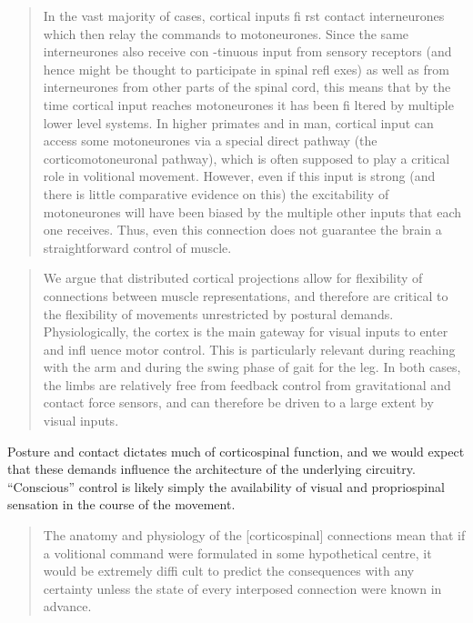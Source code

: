 \documentclass[../main.tex]{subfiles}
\begin{document}
{{{\begin{quote}
In the vast majority of cases, cortical inputs fi rst contact
interneurones which then relay the commands to motoneurones. Since the
same interneurones also receive con -tinuous input from sensory
receptors (and hence might be thought to participate in spinal refl
exes) as well as from interneurones from other parts of the spinal cord,
this means that by the time cortical input reaches motoneurones it has
been fi ltered by multiple lower level systems. In higher primates and
in man, cortical input can access some motoneurones via a special direct
pathway (the corticomotoneuronal pathway), which is often supposed to
play a critical role in volitional movement. However, even if this input
is strong (and there is little comparative evidence on this) the
excitability of motoneurones will have been biased by the multiple other
inputs that each one receives. Thus, even this connection does not
guarantee the brain a straightforward control of muscle.
\end{quote}

\begin{quote}
We argue that distributed cortical projections allow for flexibility of
connections between muscle representations, and therefore are critical
to the flexibility of movements unrestricted by postural demands.
Physiologically, the cortex is the main gateway for visual inputs to
enter and infl uence motor control. This is particularly relevant during
reaching with the arm and during the swing phase of gait for the leg. In
both cases, the limbs are relatively free from feedback control from
gravitational and contact force sensors, and can therefore be driven to
a large extent by visual inputs.
\end{quote}

Posture and contact dictates much of corticospinal function, and we
would expect that these demands influence the architecture of the
underlying circuitry. ``Conscious'' control is likely simply the
availability of visual and propriospinal sensation in the course of the
movement.

\begin{quote}
The anatomy and physiology of the {[}corticospinal{]} connections mean
that if a volitional command were formulated in some hypothetical
centre, it would be extremely diffi cult to predict the consequences
with any certainty unless the state of every interposed connection were
known in advance.
\end{quote}

}}}
\end{document}
